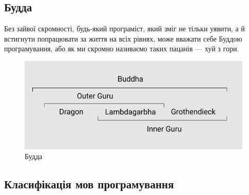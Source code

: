 \newpage
\subsection{Будда}

Без зайвої скромності, будь-який програміст, який зміг
не тільки уявити, а й встигнути попрацювати за життя
на всіх рівнях, може вважати себе Буддою програмування,
або як ми скромно називаємо таких пацанів — хуй з гори.

\begin{figure}[!htbp]
\centerline{\includegraphics[scale=0.46]{buddha.PNG}}
\caption{Будда}
\end{figure}

\newpage
\subsection{Класифікація мов програмування}

